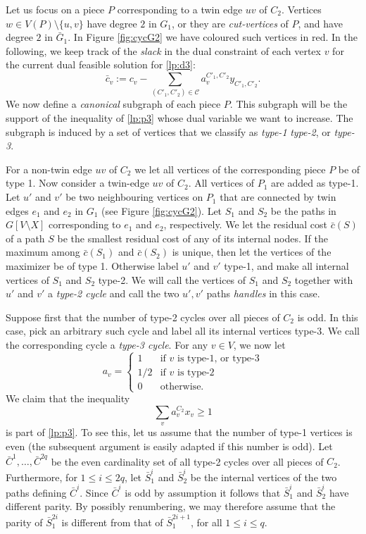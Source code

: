 \documentclass{article}
\newcommand{\C}{\ensuremath{\mathcal{C}}}
\newcommand{\0}{\mathbb{0}}
\newcommand{\1}{\mathbb{1}}
\begin{document}
Let us focus on a piece $P$ corresponding to a twin edge $uv$ of
$C_2$. Vertices $w \in V(P)\setminus  \{u,v\}$ have degree $2$ in
$G_1$, or they are {\em cut-vertices} of $P$, and have degree $2$ in
$\bar{G}_1$. In Figure \ref{fig:cycG2} we have coloured such vertices
in red.
In the following, we keep track of the 
{\em slack} in the dual constraint of each vertex $v$ for the current dual feasible
solution for \eqref{lp:d3}:
\[ \bar{c}_v := c_v - \sum_{(C'_1,C'_2) \in \C} a^{C'_1,C'_2}_vy_{C'_1,C'_2}.\]
We now define a {\em canonical} subgraph of each piece $P$. 
This subgraph will be the support of the inequality of \eqref{lp:p3} whose dual variable
we want to increase. The subgraph is induced by a set of vertices 
that we classify as {\em type-1}  
{\em type-2}, or {\em type-3}.

For a non-twin edge
$uv$ of $C_2$ we let all vertices of the corresponding piece $P$ be of type 1. 
Now consider a twin-edge $uv$ of $C_2$. All vertices of $P_1$ are added as type-1. 
Let $u'$ and $v'$ be two neighbouring vertices on $P_1$ that are connected by twin edges 
$e_1$ and $e_2$ in $G_1$ (see Figure \ref{fig:cycG2}). 
Let $S_1$ and
$S_2$ be the paths in $G[V\setminus X]$ corresponding to $e_1$ and
$e_2$, respectively. We let the residual cost $\bar{c}(S)$ of a path $S$ be the
smallest residual cost of any of its internal nodes. 
If the maximum among $\bar{c}(S_1)$ and $\bar{c}(S_2)$ is unique, then let the vertices
of the maximizer be of type 1. Otherwise label $u'$ and $v'$ type-1, and make all internal
vertices of $S_1$ and $S_2$ type-2. We will call the vertices of $S_1$ and $S_2$ together
with $u'$ and $v'$ a {\em type-2 cycle} and call the two $u',v'$ paths \emph{handles} \cite{FJP10} in this case. %

Suppose first that the number of type-2 cycles over all pieces of $C_2$ is
odd. In this case, pick an arbitrary such cycle and label all its internal
vertices type-3. We call the corresponding cycle a {\em type-3 cycle}. For any
$v \in V$, we now let
\[
  a_v = \begin{cases} 
    1 & \mbox{if $v$ is type-1, or type-3}\\
    1/2 & \mbox{if $v$ is type-2}\\
    0 & \mbox{otherwise.}  
    \end{cases}
\]
We claim that the inequality
\begin{equation}\tag{$\circledast$}\label{eq:star} 
  \sum_v a_v^{C_2} x_v \geq 1 
\end{equation}
is part of \eqref{lp:p3}. To see this, let us assume that the number of type-1
vertices is even (the subsequent argument is easily adapted if this number is
odd). Let $\bar{C}^1, \ldots, \bar{C}^{2q}$ be the even cardinality set of all
type-2 cycles over all pieces of $C_2$. Furthermore, for $1 \leq i \leq 2q$,
let $ \bar{S}^i_1$ and $\bar{S}^i_2$ be the internal vertices of the two paths
defining $\bar{C}^i$. Since $\bar{C}^i$ is odd by assumption it follows that
$\bar{S}^i_1$ and $\bar{S}^i_2$ have different parity. By possibly
renumbering, we may therefore assume that the parity of $\bar{S}^{2i}_1$ is
different from that of $\bar{S}^{2i+1}_1$, for all $1 \leq i \leq q$. 
\end{document}
